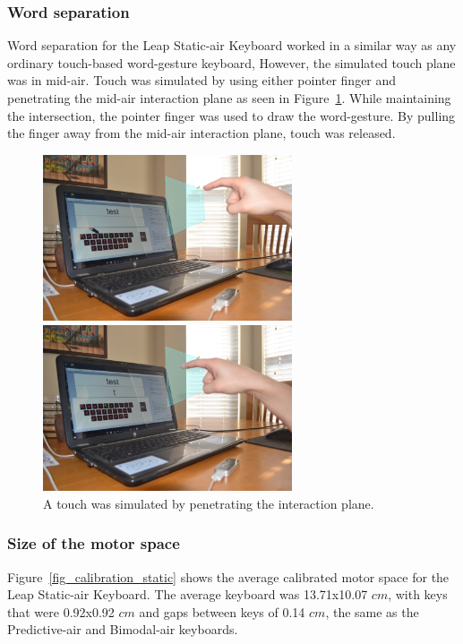\subsubsection{Word separation}
Word separation for the Leap Static-air Keyboard worked in a similar way as any ordinary touch-based word-gesture keyboard, However, the simulated touch plane was in mid-air. Touch was simulated by using either pointer finger and penetrating the mid-air interaction plane as seen in Figure~\ref{static_press_comparison}. While maintaining the intersection, the pointer finger was used to draw the word-gesture. By pulling the finger away from the mid-air interaction plane, touch was released.

\begin{figure}[!t]
	\centering
	\begin{minipage}[t]{5.8in}
		\begin{minipage}[t]{2.85in}
			\includegraphics[width=2.9in]{Figures/fig_static_hover}
		\end{minipage}
		\begin{minipage}[t]{2.9in}
			\includegraphics[width=2.9in]{Figures/fig_static_touch}
		\end{minipage}
	\end{minipage}
	\caption[Leap Static-air Word Separation]{A touch was simulated by penetrating the interaction plane.}
	\label{static_press_comparison}
\end{figure}

\subsubsection{Size of the motor space}
Figure~\ref{fig_calibration_static} shows the average calibrated motor space for the Leap Static-air Keyboard. The average keyboard was 13.71x10.07 $cm$, with keys that were 0.92x0.92 $cm$ and gaps between keys of 0.14 $cm$, the same as the Predictive-air and Bimodal-air keyboards.

